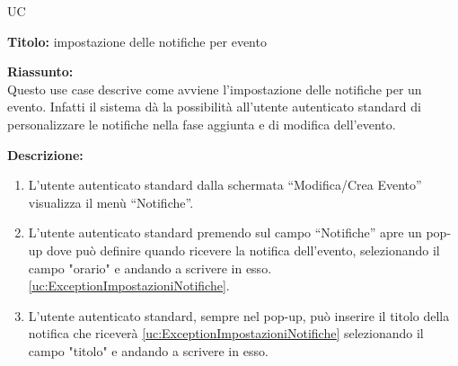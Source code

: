 \begin{listaPersonale}{UC}






    \newpage


    \begin{center}
        
    \end{center}

    \textbf{Titolo:} impostazione delle notifiche per evento

    \textbf{Riassunto:} \\
    Questo use case descrive come avviene l'impostazione delle notifiche per un evento. Infatti il sistema dà la possibilità all'utente autenticato standard di personalizzare le notifiche nella fase aggiunta e di modifica dell'evento.

    \textbf{Descrizione:}
    \begin{enumerate}
        \item L'utente autenticato standard dalla schermata “Modifica/Crea Evento” visualizza il menù “Notifiche”.
        \item L'utente autenticato standard premendo sul campo “Notifiche” apre un pop-up dove può definire quando ricevere la notifica dell'evento, selezionando il campo "orario" e andando a scrivere in esso. \ref{uc:ExceptionImpostazioniNotifiche}.
        \item L'utente autenticato standard, sempre nel pop-up, può inserire il titolo della notifica che riceverà \ref{uc:ExceptionImpostazioniNotifiche} selezionando il campo "titolo" e andando a scrivere in esso.
    \end{enumerate}


\end{listaPersonale}
